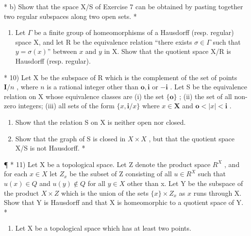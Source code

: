 * b) Show that the space X/S of Exercise 7 can be obtained by pasting together two regular subspaces along two open sets. *

\begin{enumerate}
\def\labelenumi{\arabic{enumi})}
\setcounter{enumi}{8}
\tightlist
\item
  Let \(\Gamma\) be a finite group of homeomorphisms of a Hausdorff (resp. regular) space X, and let R be the equivalence relation ``there exists \(\sigma \in \Gamma\) such that \(y = \sigma(x)\)'' between \(x\) and \(y\) in X. Show that the quotient space X/R is Hausdorff (resp. regular).
\end{enumerate}

* 10) Let X be the subspace of R which is the complement of the set of points \(\mathbf{I} / n\) , where \(n\) is a rational integer other than \(\mathbf{o}, \mathbf{i}\) or \(-\mathbf{i}\) . Let S be the equivalence relation on X whose equivalence classes are (i) the set \(\{\mathbf{o}\}\) ; (ii) the set of all non-zero integers; (iii) all sets of the form \(\{x, \mathbf{i} / x\}\) where \(x \in \mathbf{X}\) and \(\mathbf{o} < |x| < \mathbf{i}\) .

\begin{enumerate}
\def\labelenumi{\alph{enumi})}
\item
  Show that the relation S on X is neither open nor closed.
\item
  Show that the graph of S is closed in \(X \times X\) , but that the quotient space X/S is not Hausdorff. *
\end{enumerate}

¶ * 11) Let X be a topological space. Let Z denote the product space \(R^{X}\) , and for each \(x \in X\) let \(Z_{x}\) be the subset of Z consisting of all \(u \in R^{X}\) such that \(u(x) \in Q\) and \(u(y) \notin Q\) for all \(y \in X\) other than x. Let Y be the subspace of the product \(X \times Z\) which is the union of the sets \(\{x\} \times Z_x\) as \(x\) runs through X. Show that Y is Hausdorff and that X is homeomorphic to a quotient space of Y. *

\begin{enumerate}
\def\labelenumi{\arabic{enumi})}
\setcounter{enumi}{11}
\tightlist
\item
  Let X be a topological space which has at least two points.
\end{enumerate}

